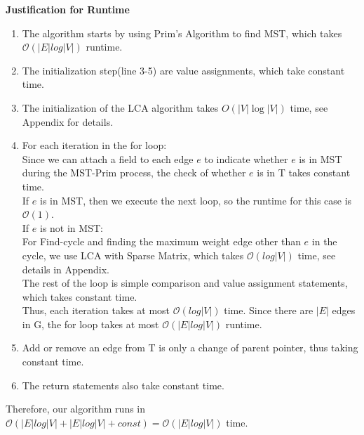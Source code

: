 \documentclass[11pt]{article}
\begin{document}
\begin{enumerate}
\textbf{Justification for Runtime}
\begin{enumerate}[1.]
    \item The algorithm starts by using Prim's Algorithm to find MST, which takes $\mathcal{O}(|E|log|V|)$ runtime.
    \item The initialization step(line 3-5) are value assignments, which take constant time.
    \item The initialization of the LCA algorithm takes $O(|V|\log|V|)$ time, see Appendix for details. 
    \item For each iteration in the for loop:\\
    Since we can attach a field to each edge $e$ to indicate whether $e$ is in MST during the MST-Prim process, the check of whether $e$ is in T takes constant time.\\[2ex]
    If $e$ is in MST, then we execute the next loop, so the runtime for this case is $\mathcal{O}(1)$.\\
    If $e$ is not in MST:\\
    For Find-cycle and finding the maximum weight edge other than $e$ in the cycle, we  use LCA with Sparse Matrix, which takes $\mathcal{O}(log|V|)$ time, see details in Appendix.\\[2ex]
    The rest of the loop is simple comparison and value assignment statements, which takes constant time.\\
    Thus, each iteration takes at most $\mathcal{O}(log |V|)$ time. Since there are $|E|$ edges in G, the for loop takes at most $\mathcal{O}(|E| log|V|)$ runtime.
    \item Add or remove an edge from T is only a change of parent pointer, thus taking constant time.
    \item The return statements also take constant time.
\end{enumerate}
 Therefore, our algorithm runs in $\mathcal{O}(|E|log|V| + |E|log|V| + const) = \mathcal{O}(|E|log |V|)$ time.
\end{enumerate}
\end{document}
